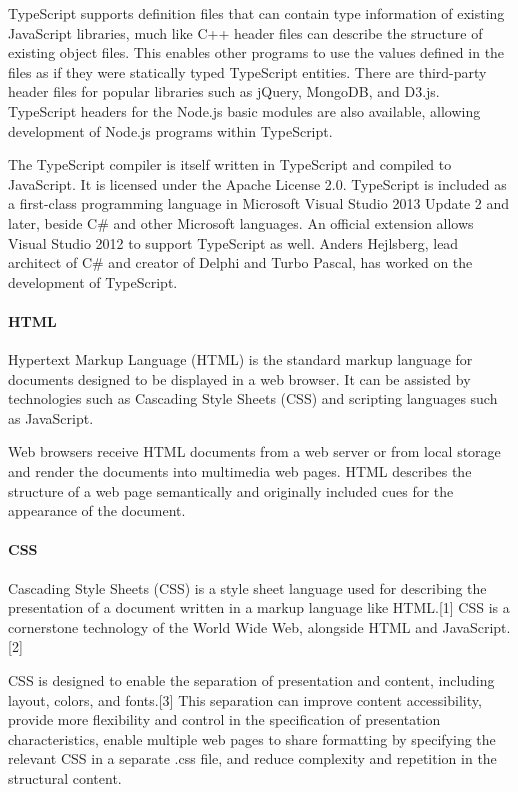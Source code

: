 TypeScript supports definition files that can contain type information of existing JavaScript libraries, much like C++ header files can describe the structure of existing object files. This enables other programs to use the values defined in the files as if they were statically typed TypeScript entities. There are third-party header files for popular libraries such as jQuery, MongoDB, and D3.js. TypeScript headers for the Node.js basic modules are also available, allowing development of Node.js programs within TypeScript.

The TypeScript compiler is itself written in TypeScript and compiled to JavaScript. It is licensed under the Apache License 2.0. TypeScript is included as a first-class programming language in Microsoft Visual Studio 2013 Update 2 and later, beside C\# and other Microsoft languages. An official extension allows Visual Studio 2012 to support TypeScript as well. Anders Hejlsberg, lead architect of C\# and creator of Delphi and Turbo Pascal, has worked on the development of TypeScript.

\paragraph{HTML}
Hypertext Markup Language (HTML) is the standard markup language for documents designed to be displayed in a web browser. It can be assisted by technologies such as Cascading Style Sheets (CSS) and scripting languages such as JavaScript.

Web browsers receive HTML documents from a web server or from local storage and render the documents into multimedia web pages. HTML describes the structure of a web page semantically and originally included cues for the appearance of the document.



\paragraph{CSS}
Cascading Style Sheets (CSS) is a style sheet language used for describing the presentation of a document written in a markup language like HTML.[1] CSS is a cornerstone technology of the World Wide Web, alongside HTML and JavaScript.[2]

CSS is designed to enable the separation of presentation and content, including layout, colors, and fonts.[3] This separation can improve content accessibility, provide more flexibility and control in the specification of presentation characteristics, enable multiple web pages to share formatting by specifying the relevant CSS in a separate .css file, and reduce complexity and repetition in the structural content.


